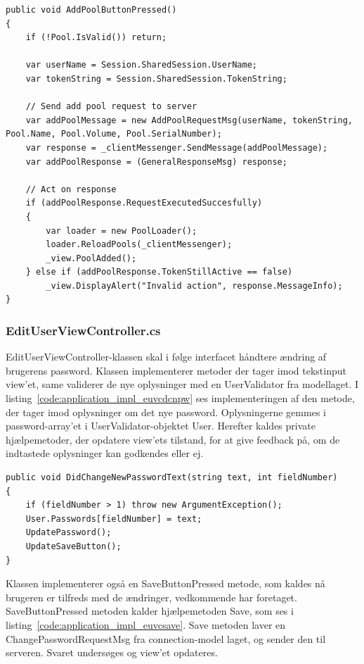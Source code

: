 \begin{lstlisting}[caption={AddPoolButtonPressed()},label={code:application_impl_apvcadbp}]
public void AddPoolButtonPressed()
{
	if (!Pool.IsValid()) return;

	var userName = Session.SharedSession.UserName;
	var tokenString = Session.SharedSession.TokenString;

	// Send add pool request to server
	var addPoolMessage = new AddPoolRequestMsg(userName, tokenString, Pool.Name, Pool.Volume, Pool.SerialNumber);
	var response = _clientMessenger.SendMessage(addPoolMessage);
	var addPoolResponse = (GeneralResponseMsg) response;

	// Act on response
	if (addPoolResponse.RequestExecutedSuccesfully)
	{
		var loader = new PoolLoader();
		loader.ReloadPools(_clientMessenger);
		_view.PoolAdded();
	} else if (addPoolResponse.TokenStillActive == false)
		_view.DisplayAlert("Invalid action", response.MessageInfo);
}
\end{lstlisting}

\subsubsection{EditUserViewController.cs}
EditUserViewController-klassen skal i følge interfacet håndtere ændring af brugerens password. Klassen implementerer metoder der tager imod tekstinput view'et, same validerer de nye oplysninger med en UserValidator fra modellaget. I listing~\ref{code:application_impl_euvcdcnpw} ses implementeringen af den metode, der tager imod oplysninger om det nye password. Oplysningerne gemmes i password-array'et i UserValidator-objektet User. Herefter kaldes private hjælpemetoder, der opdatere view'ets tilstand, for at give feedback på, om de indtastede oplysninger kan godkendes eller ej.

\begin{lstlisting}[caption={DidChangeNewPasswordText(...)},label={code:application_impl_euvcdcnpw}]
public void DidChangeNewPasswordText(string text, int fieldNumber)
{
	if (fieldNumber > 1) throw new ArgumentException();
	User.Passwords[fieldNumber] = text;
	UpdatePassword();
	UpdateSaveButton();
}
\end{lstlisting}

Klassen implementerer også en SaveButtonPressed metode, som kaldes nå brugeren er tilfreds med de ændringer, vedkommende har foretaget. SaveButtonPressed metoden kalder hjælpemetoden Save, som ses i listing~\ref{code:application_impl_euvcsave}. Save metoden laver en ChangePasswordRequestMsg fra connection-model laget, og sender den til serveren. Svaret undersøges og view'et opdateres.

